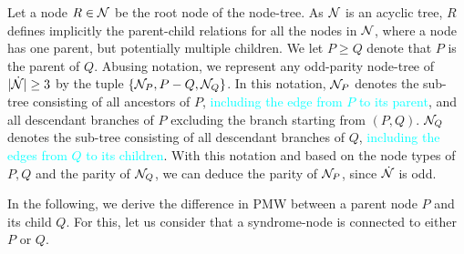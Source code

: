 

Let a node $R\in \mathcal{N}$ be the root node of the node-tree. As $\mathcal{N}$ is an acyclic tree, $R$ defines implicitly the parent-child relations for all the nodes in $\mathcal{N}$, where a node has one parent, but potentially multiple children. We let $P\geq Q$ denote that $P$ is the parent of $Q$. Abusing notation, we represent any odd-parity node-tree of $\lvert\dot{\mathcal{N}}\rvert\geq 3$ by the tuple $\{\mathcal{N}_P,P-Q,\mathcal{N}_Q\}$. In this notation, $\mathcal{N}_P$ denotes the sub-tree consisting of all ancestors of $P$, \textcolor{cyan}{including the edge from $P$ to its parent}, and all descendant branches of $P$ excluding the branch starting from $(P,Q)$.  $\mathcal{N}_Q$ denotes the sub-tree consisting of all descendant branches of $Q$, \textcolor{cyan}{including the edges from $Q$ to its children}. With this notation and based on the node types of $P,Q$ and the parity of $\mathcal{N}_Q$, we can deduce the parity of $\mathcal{N}_P$, since $\dot{\mathcal{N}}$ is odd. 

In the following, we derive the difference in PMW between a parent node $P$ and its child $Q$. For this, let us consider that a syndrome-node is connected to either $P$ or $Q$. 

